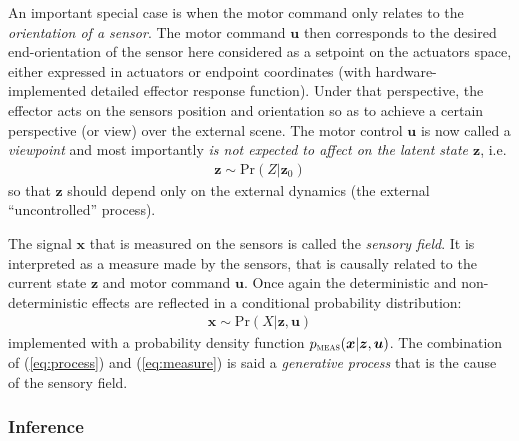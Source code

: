 \documentclass[12pt,twoside,openright]{article}
\begin{document}
An important special case is when the motor command only relates to the \emph{orientation of a sensor}. The motor command $\boldsymbol{u}$ then corresponds to the desired end-orientation of the sensor here considered as a setpoint on the actuators space, either expressed in actuators or endpoint coordinates (with hardware-implemented detailed effector response function).  
Under that perspective, the effector acts on the sensors position and orientation so as to achieve a certain perspective (or view) over the external scene. The motor control $\boldsymbol{u}$ is now called a \emph{viewpoint} and most importantly \emph{is not expected to affect on the latent state $\boldsymbol{z}$}, i.e.
\begin{align}
\boldsymbol{z} \sim \text{Pr}(Z|\boldsymbol{z}_0)
\end{align} 
so that $\boldsymbol{z}$ should depend only on the external dynamics (the external ``uncontrolled'' process).

The signal $\boldsymbol{x}$ that is measured on the sensors is called the \emph{sensory field}. It is interpreted as a measure made by the sensors, that is causally related to the current state $\boldsymbol{z}$ and motor command $\boldsymbol{u}$. Once again the deterministic and non-deterministic effects are reflected in a conditional probability distribution:
\begin{align}
\boldsymbol{x} \sim \text{Pr}(X|\boldsymbol{z},\boldsymbol{u})\label{eq:measure}
\end{align}
implemented with a probability density function 
$p_\text{\sc meas}(\boldsymbol{x}|\boldsymbol{z},\boldsymbol{u})$.
The combination of  (\ref{eq:process}) and (\ref{eq:measure}) is said a \emph{generative process} that is the cause of the sensory field. 


\subsubsection{Inference}
\end{document}
